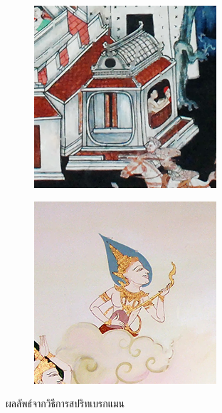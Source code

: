 \documentclass[hidelinks, a4paper,12pt]{article}
\numberwithin{equation}{section}							%
\numberwithin{equation}{section}
\begin{document}
{\begin{figure}[H]
\begin{subfigure}{0.4\linewidth}
			\includegraphics[width=0.8\linewidth]{images/result_ex4/splitbergman_case04.png}			
		\end{subfigure}
		\begin{subfigure}{0.4\linewidth}
			\centering
			\includegraphics[width=0.8\linewidth]{images/result_ex4/splitbergman_case05.png}			
		\end{subfigure}
		\caption{ผลลัพธ์จากวิธีการสปริทเบรกแมน}
	\end{figure}
	\begin{figure}[H]
		\centering
		\begin{subfigure}{0.4\linewidth}

\end{subfigure}
\end{figure}}
\end{document}
